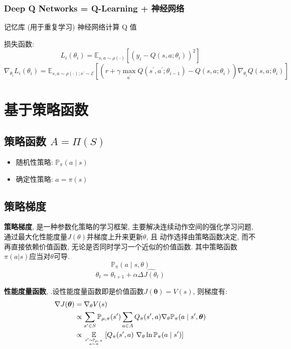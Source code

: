 \documentclass{article}
\begin{document}
    	\subsubsection{Deep Q Networks = Q-Learning + 神经网络}
    	    记忆库 (用于重复学习)
            神经网络计算 Q 值
    	
            损失函数:
                $$L_{i}\left(\theta_{i}\right)=\mathbb{E}_{s, a \sim \rho(\cdot)}\left[\left(y_{i}-Q\left(s, a ; \theta_{i}\right)\right)^{2}\right]$$
                $$\nabla_{\theta_{i}} L_{i}\left(\theta_{i}\right)=\mathbb{E}_{s, a \sim \rho(\cdot) ; s^{\prime} \sim \mathcal{E}}\left[\left(r+\gamma \max _{a^{\prime}} Q\left(s^{\prime}, a^{\prime} ; \theta_{i-1}\right)-Q\left(s, a ; \theta_{i}\right)\right) \nabla_{\theta_{i}} Q\left(s, a ; \theta_{i}\right)\right]$$


\section{基于策略函数}
    \subsection{策略函数 $A = \Pi(S)$}
        \begin{itemize}
            \item 随机性策略: $\mathbb{P}_\pi(a \mid s)$
            \item 确定性策略: $a = \pi(s)$
        \end{itemize}

    \subsection{策略梯度}
        \textbf{策略梯度}, 是一种参数化策略的学习框架, 主要解决连续动作空间的强化学习问题,  通过最大化性能度量$J(\theta)$并梯度上升来更新$\theta$, 且 动作选择由策略函数决定, 而不再直接依赖价值函数, 无论是否同时学习一个近似的价值函数. 其中策略函数$\pi(a|s)$应当对$\theta$可导.
            $$\mathbb{P}_\pi (a \mid s, \theta)$$
            $$ \theta_t = \theta_{t+1} + \alpha  \widehat{\Delta J(\theta_t)}$$
        
        \textbf{性能度量函数}, .设性能度量函数即是价值函数$J(\boldsymbol{\theta}) = V(s)$, 则梯度有:
            \begin{align*}
                \nabla J(\boldsymbol{\theta}) &= \nabla_\theta V(s) \\
                &\propto \sum\limits_{s' \in S} \mathbb P_{\mu, \pi}(s') \sum\limits_{a \in A} Q_{\pi}(s', a) \nabla_{\theta} \mathbb{P}_\pi(a \mid s', \boldsymbol{\theta}) \\
                & \propto \underset{s' \sim \mathbb P_{\mu, \pi} \atop a \sim \pi}{\mathbb E} \left[Q_{\pi}(s', a)\  \nabla_\theta \ln \mathbb{P}_\pi (a \mid s') \right]
            \end{align*}
        
\end{document}
